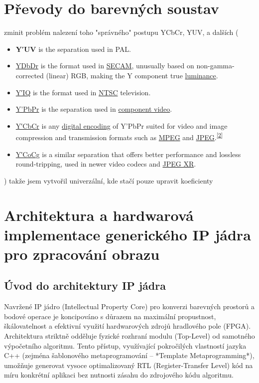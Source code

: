 \section{Převody do barevných soustav}
zminit problém nalezení toho "správného" postupu YCbCr, YUV,  a dalších (
\begin{itemize}
    \item \textbf{Y′UV} is the separation used in PAL.
    \item \href{https://en.wikipedia.org/wiki/YDbDr}{YDbDr} is the format used in \href{https://en.wikipedia.org/wiki/SECAM}{SECAM}, unusually based on non-gamma-corrected (linear) RGB, making the Y component true \href{https://en.wikipedia.org/wiki/Luminance}{luminance}.
    \item \href{https://en.wikipedia.org/wiki/YIQ}{Y′IQ} is the format used in \href{https://en.wikipedia.org/wiki/NTSC}{NTSC} television.
    \item \href{https://en.wikipedia.org/wiki/YPbPr}{Y'PbPr} is the separation used in \href{https://en.wikipedia.org/wiki/Component_video}{component video}.
    \item \href{https://en.wikipedia.org/wiki/YCbCr}{Y′CbCr} is any \href{https://en.wikipedia.org/wiki/Digital_component_video}{digital encoding} of Y'PbPr suited for video and image compression and transmission formats such as \href{https://en.wikipedia.org/wiki/Moving_Picture_Experts_Group}{MPEG} and \href{https://en.wikipedia.org/wiki/JPEG}{JPEG}.\textsuperscript{\href{https://en.wikipedia.org/wiki/Y\%E2\%80\%B2UV\#cite_note-Poynton-2}{[2]}}
    \item \href{https://en.wikipedia.org/wiki/YCoCg}{Y′CoCg} is a similar separation that offers better performance and lossless round-tripping, used in newer video codecs and \href{https://en.wikipedia.org/wiki/JPEG_XR}{JPEG XR}.
\end{itemize}
 ) takže jsem vytvořil univerzální, kde stačí pouze upravit koeficienty

\section{Architektura a hardwarová implementace generického IP jádra pro zpracování obrazu}

\subsection{Úvod do architektury IP jádra}
Navržené IP jádro (Intellectual Property Core) pro konverzi barevných prostorů a bodové operace je koncipováno s důrazem na maximální propustnost, škálovatelnost a efektivní využití hardwarových zdrojů hradlového pole (FPGA). Architektura striktně odděluje fyzické rozhraní modulu (Top-Level) od samotného výpočetního algoritmu. Tento přístup, využívající pokročilých vlastností jazyka C++ (zejména šablonového metaprogramování – *Template Metaprogramming*), umožňuje generovat vysoce optimalizovaný RTL (Register-Transfer Level) kód na míru konkrétní aplikaci bez nutnosti zásahu do zdrojového kódu algoritmu.

